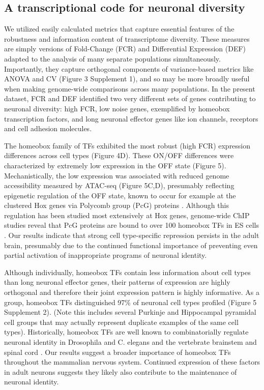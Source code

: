 \subsection{A transcriptional code for neuronal diversity}
We utilized easily calculated metrics that capture essential features of the robustness and information content of transcriptome diversity. These measures are simply versions of Fold-Change (FCR) and Differential Expression (DEF) adapted to the analysis of many separate populations simultaneously. Importantly, they capture orthogonal components of variance-based metrics like ANOVA and CV (Figure 3 Supplement 1), and so may be more broadly useful when making genome-wide comparisons across many populations. In the present dataset, FCR and DEF identified two very different sets of genes contributing to neuronal diversity: high FCR, low noise genes, exemplified by homeobox transcription factors, and long neuronal effector genes like ion channels, receptors and cell adhesion molecules. 

The homeobox family of TFs exhibited the most robust (high FCR) expression differences across cell types (Figure 4D). These ON/OFF differences were characterized by extremely low expression in the OFF state (Figure 5). Mechanistically, the low expression was associated with reduced genome accessibility measured by ATAC-seq (Figure 5C,D), presumably reflecting epigenetic regulation of the OFF state, known to occur for example at the clustered Hox genes via Polycomb group (PcG) proteins \citep{Montavon_2014}. Although this regulation has been studied most extensively at Hox genes, genome-wide ChIP studies reveal that PcG proteins are bound to over 100 homeobox TFs in ES cells \citep{Boyer_2006}. Our results indicate that strong cell type-specific repression persists in the adult brain, presumably due to the continued functional importance of preventing even partial activation of inappropriate programs of neuronal identity. 

Although individually, homeobox TFs contain less information about cell types than long neuronal effector genes, their patterns of expression are highly orthogonal and therefore their joint expression pattern is highly informative. As a group, homeobox TFs distinguished 97\% of neuronal cell types profiled (Figure 5 Supplement 2). (Note this includes several Purkinje and Hippocampal pyramidal cell groups that may actually represent duplicate examples of the same cell types). Historically, homeobox TFs are well known to combinatorially regulate neuronal identity in Drosophila and C. elegans \citep{Kratsios_2017} and the vertebrate brainstem and spinal cord \citep{Dasen_2009,Philippidou_2013}. Our results suggest a broader importance of homeobox TFs throughout the mammalian nervous system. Continued expression of these factors in adult neurons suggests they likely also contribute to the maintenance of neuronal identity.

